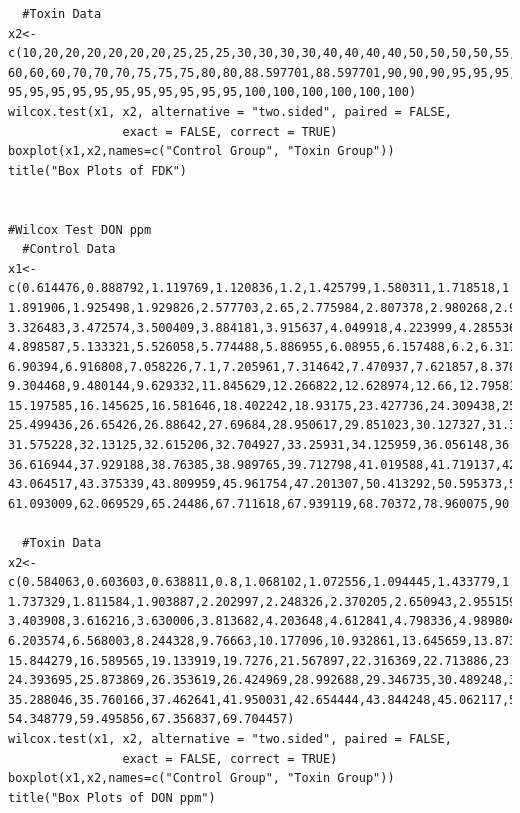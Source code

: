 \documentclass[11pt]{article}
\begin{document}
\begin{verbatim}
  #Toxin Data
x2<-c(10,20,20,20,20,20,20,25,25,25,30,30,30,30,40,40,40,40,50,50,50,50,55,60,60,
60,60,60,70,70,70,75,75,75,80,80,88.597701,88.597701,90,90,90,95,95,95,95,95,95,
95,95,95,95,95,95,95,95,95,95,95,100,100,100,100,100,100)
wilcox.test(x1, x2, alternative = "two.sided", paired = FALSE, 
                exact = FALSE, correct = TRUE)
boxplot(x1,x2,names=c("Control Group", "Toxin Group"))
title("Box Plots of FDK")


#Wilcox Test DON ppm
  #Control Data
x1<-c(0.614476,0.888792,1.119769,1.120836,1.2,1.425799,1.580311,1.718518,1.856635,
1.891906,1.925498,1.929826,2.577703,2.65,2.775984,2.807378,2.980268,2.999115,
3.326483,3.472574,3.500409,3.884181,3.915637,4.049918,4.223999,4.285536,4.749604,
4.898587,5.133321,5.526058,5.774488,5.886955,6.08955,6.157488,6.2,6.317295,6.452412,
6.90394,6.916808,7.058226,7.1,7.205961,7.314642,7.470937,7.621857,8.378225,8.822314,
9.304468,9.480144,9.629332,11.845629,12.266822,12.628974,12.66,12.795816,13.358016,
15.197585,16.145625,16.581646,18.402242,18.93175,23.427736,24.309438,25.019106,
25.499436,26.65426,26.88642,27.69684,28.950617,29.851023,30.127327,31.310614,
31.575228,32.13125,32.615206,32.704927,33.25931,34.125959,36.056148,36.577781,
36.616944,37.929188,38.76385,38.989765,39.712798,41.019588,41.719137,42.985482,
43.064517,43.375339,43.809959,45.961754,47.201307,50.413292,50.595373,51.529422,
61.093009,62.069529,65.24486,67.711618,67.939119,68.70372,78.960075,90.895459)

  #Toxin Data
x2<-c(0.584063,0.603603,0.638811,0.8,1.068102,1.072556,1.094445,1.433779,1.495372,
1.737329,1.811584,1.903887,2.202997,2.248326,2.370205,2.650943,2.955159,3.217394,
3.403908,3.616216,3.630006,3.813682,4.203648,4.612841,4.798336,4.989804,5.569431,
6.203574,6.568003,8.244328,9.76663,10.177096,10.932861,13.645659,13.873584,15.832693,
15.844279,16.589565,19.133919,19.7276,21.567897,22.316369,22.713886,23.378631,
24.393695,25.873869,26.353619,26.424969,28.992688,29.346735,30.489248,32.064561,
35.288046,35.760166,37.462641,41.950031,42.654444,43.844248,45.062117,50.137477,
54.348779,59.495856,67.356837,69.704457)
wilcox.test(x1, x2, alternative = "two.sided", paired = FALSE, 
                exact = FALSE, correct = TRUE)
boxplot(x1,x2,names=c("Control Group", "Toxin Group"))
title("Box Plots of DON ppm")
\end{verbatim}
\end{document}
